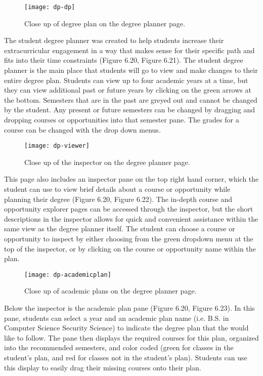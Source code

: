 \begin{figure}[htbp!]
\centering
\texttt{[image: dp-dp]}
\caption{Close up of degree plan on the degree planner page.}
\end{figure}
The student degree planner was created to help students increase their extracurricular engagement in a way that makes sense for their specific path and fits into their time constraints (Figure 6.20, Figure 6.21). The student degree planner is the main place that students will go to view and make changes to their entire degree plan. Students can view up to four academic years at a time, but they can view additional past or future years by clicking on the green arrows at the bottom. Semesters that are in the past are greyed out and cannot be changed by the student. Any present or future semesters can be changed by dragging and dropping courses or opportunities into that semester pane. The grades for a course can be changed with the drop down menus. 

\begin{figure}[htbp!]
\centering
\texttt{[image: dp-viewer]}
\caption{Close up of the inspector on the degree planner page.}
\end{figure}

This page also includes an inspector pane on the top right hand corner, which the student can use to view brief details about a course or opportunity while planning their degree (Figure 6.20, Figure 6.22). The in-depth course and opportunity explorer pages can be accessed through the inspector, but the short descriptions in the inspector allows for quick and convenient assistance within the same view as the degree planner itself. The student can choose a course or opportunity to inspect by either choosing from the green dropdown menu at the top of the inspector, or by clicking on the course or opportunity name within the plan. 

\begin{figure}[htbp!]
\centering
\texttt{[image: dp-academicplan]}
\caption{Close up of academic plans on the degree planner page.}
\end{figure}
Below the inspector is the academic plan pane (Figure 6.20, Figure 6.23). In this pane, students can select a year and an academic plan name (i.e. B.S. in Computer Science Security Science) to indicate the degree plan that the would like to follow. The pane then displays the required courses for this plan, organized into the recommended semesters, and color coded (green for classes in the student's plan, and red for classes not in the student's plan). Students can use this display to easily drag their missing courses onto their plan.


